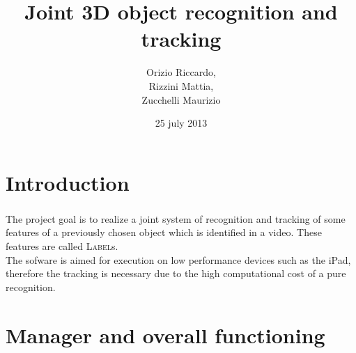 \documentclass{beamer}
\title{Joint 3D object recognition and tracking}
\author[Orizio, Rizzini, Zucchelli]{Orizio Riccardo,\\Rizzini Mattia,\\Zucchelli Maurizio}
\date{25 july 2013}
\institute[UniBS]{University of Brescia}
\begin{document}
  \begin{frame}
    \maketitle
  \end{frame}

  \section{Introduction}
  
  \begin{frame}
    \frametitle{\insertsection}
    The project goal is to realize a joint system of recognition and tracking
    of some features of a previously chosen object which is identified in a
    video.  These features are called \textsc{Label}s.\\
    The sofware is aimed for execution on low performance devices such as the
    iPad, therefore the tracking is necessary due to the high computational
    cost of a pure recognition.\\
  \end{frame}


  \section{Manager and overall functioning}
\end{document}

